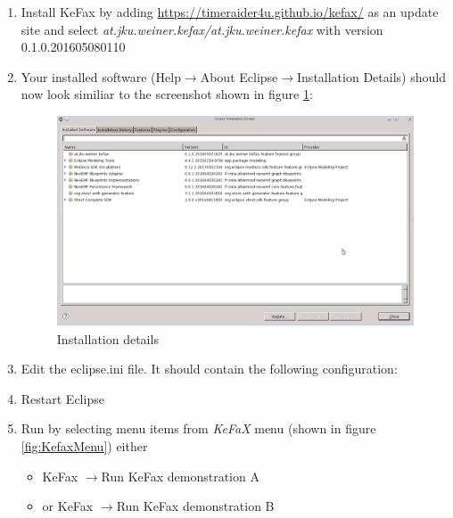 \begin{enumerate}
  \item\label{howToUseKefaxInstall} Install KeFax by adding \url{https://timeraider4u.github.io/kefax/}\cite{Kefax_URL}
  as an update site and select {\it at.jku.weiner.kefax/at.jku.weiner.kefax} with version 0.1.0.201605080110
  \item Your installed software (Help$\rightarrow$About Eclipse$\rightarrow$Installation Details) 
  should now look similiar to the screenshot shown in figure \ref{fig:EclipseInstall}:
  \begin{figure}[ht]
    \centering
	\includegraphics[scale=0.5]{images/install-software}
	\caption{Installation details}
    \label{fig:EclipseInstall}
  \end{figure}
  \FloatBarrier
  \item Edit the eclipse.ini file. It should contain the following configuration:
  
  \item\label{howToUseRestart} Restart Eclipse
  \item Run by selecting menu items from {\it KeFaX} menu (shown in figure \ref{fig:KefaxMenu}) either
    \begin{itemize}
     \item KeFax $\rightarrow$Run KeFax demonstration A
     \item or KeFax $\rightarrow$Run KeFax demonstration B
    \end{itemize}
\end{enumerate}

